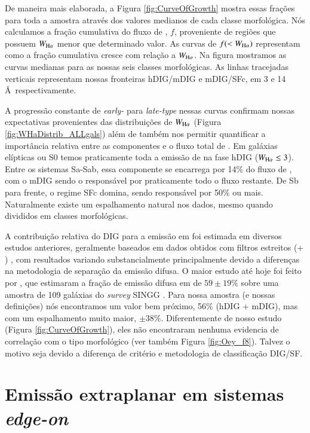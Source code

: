 De maneira mais elaborada, a Figura \ref{fig:CurveOfGrowth} mostra essas frações para toda a amostra através dos valores medianos de cada classe morfológica. Nós calculamos a fração cumulativa do fluxo de \Ha, $f$, proveniente de regiões que possuem $W_{\Ha}$ menor que determinado valor. As curvas de $f(<W_{\Ha})$ representam como a fração cumulativa cresce com relação a $W_{\Ha}$. Na figura mostramos as curvas medianas para as nossas seis classes morfológicas. As linhas tracejadas verticais representam nossas fronteiras hDIG/mDIG e mDIG/SFc, em 3 e 14 \AA\ respectivamente.

A progressão constante de {\em early-} para {\em late-type} nessas curvas confirmam nossas expectativas provenientes das distribuições de $W_{\Ha}$ (Figura \ref{fig:WHaDistrib_ALLgals}) além de também nos permitir quantificar a importância relativa entre as componentes e o fluxo total de \Ha. Em galáxias elípticas ou S0 temos praticamente toda a emissão de \Ha na fase hDIG ($W_{\Ha} \le 3$). Entre os sistemas Sa-Sab, essa componente se encarrega por 14\% do fluxo de \Ha, com o mDIG sendo o responsável por praticamente todo o fluxo restante. De Sb para frente, o regime SFc domina, sendo responsável por 50\% ou mais. Naturalmente existe um espalhamento natural nos dados, mesmo quando divididos em classes morfológicas.

A contribuição relativa do DIG para a emissão em \Ha foi estimada em diversos estudos anteriores, geralmente baseados em dados obtidos com filtros estreitos (\Ha + \nii) \citep{Ferguson.etal.1996, Zurita.etal.2000, Thilker.etal.2002, Oey.etal.2007}, com resultados variando substancialmente principalmente devido a diferenças na metodologia de separação da emissão difusa. O maior estudo até hoje foi feito por \citet{Oey.etal.2007}, que estimaram a fração de emissão difusa em \Ha de $59\pm19 \%$ sobre uma amostra de 109 galáxias do {\em survey} SINGG \citep{Meurer.etal.2006}. Para nossa amostra (e nossas definições) nós encontramos um valor bem próximo, 56\% (hDIG + mDIG), mas com um espalhamento muito maior, $\pm38 \%$. Diferentemente de nosso estudo (Figura \ref{fig:CurveOfGrowth}), eles não encontraram nenhuma evidencia de correlação com o tipo morfológico (ver também Figura \ref{fig:Oey_f8}). Talvez o motivo seja devido a diferença de critério e metodologia de classificação DIG/SF.


\section{Emissão extraplanar em sistemas {\em edge-on}}
\label{sec:DIGdisc:edgeon}

